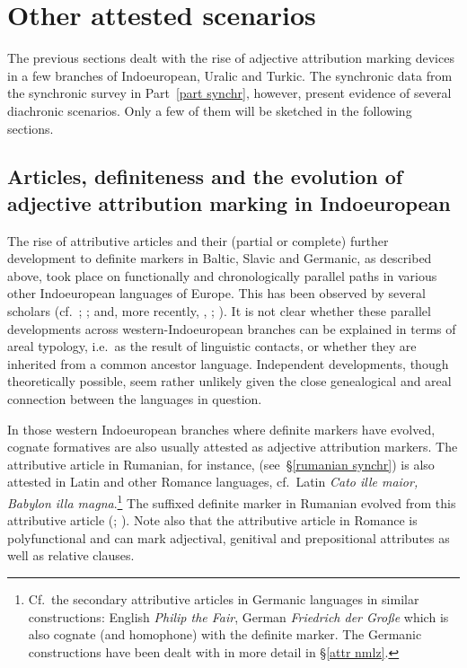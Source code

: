 {\section{Other attested scenarios}
The previous sections dealt with the rise of adjective attribution marking devices in a few branches of Indoeuropean, Uralic and Turkic. The synchronic data from the synchronic survey in Part~\ref{part synchr}, however, present evidence of several diachronic scenarios. Only a few of them will be sketched in the following sections.

\subsection[Articles, definiteness and adjective attribution]{Articles, definiteness and the evolution of adjective attribution marking in Indoeuropean}
The rise of attributive articles and their (partial or complete) further development to definite markers in Baltic, Slavic and Germanic, as described above, took place  on functionally and chronologically parallel paths in various other Indoeuropean languages of Europe. This has been observed by several scholars (cf.~\citealt{brugmann-etal1916}; \citealt{gamillscheg1937}; \citealt{heinrichs1954} and, more recently, \citealt{nocentini1996}, \citealt{philippi1997}; \citealt{himmelmann1997}). It is not clear whether these parallel developments across western-Indoeuropean branches can be explained in terms of areal typology, i.e.~as the result of linguistic contacts, or whether they are inherited from a common ancestor language. Independent developments, though theoretically possible, seem rather unlikely given the close genealogical and areal connection between the languages in question.

In those western Indoeuropean branches where definite markers have evolved, cognate formatives are also usually attested as adjective attribution markers. The attributive article in Rumanian, for instance, (see~\S\ref{rumanian synchr}) is also attested in Latin and other Romance languages, cf.~Latin \textit{Cato ille maior, Babylon illa magna}.\footnote{Cf.~the secondary attributive articles in Germanic languages in similar constructions: English \textit{Philip the Fair}, German \textit{Friedrich der Große} which is also cognate (and homophone) with the definite marker. The Germanic constructions have been dealt with in more detail in \S\ref{attr nmlz}.} The suffixed definite marker in Rumanian evolved from this attributive article (\citealt{gamillscheg1937}; \citealt[5]{nocentini1996}). Note also that the attributive article in Romance is polyfunctional and can mark adjectival, genitival and prepositional attributes as well as relative clauses.

}
